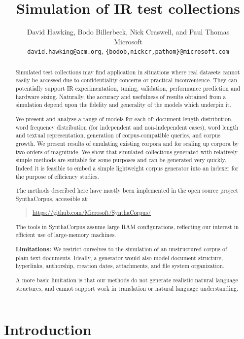\documentclass[11pt]{report}
\title{Simulation of IR test collections}
\author{David Hawking,
Bodo Billerbeck,
Nick Craswell, and 
Paul Thomas\\
Microsoft\\
\small \texttt{david.hawking@acm.org}, \texttt{\{bodob,nickcr,pathom\}@microsoft.com}
}
\newcommand{\GHRepo}{\url{https://github.com/Microsoft/SynthaCorpus/}}
\begin{document}
\maketitle{}

\tableofcontents

\begin{abstract}
Simulated test collections may find application in situations where real
datasets cannot easily be accessed due to confidentiality concerns or
practical inconvenience.  They can potentially support IR
experimentation, tuning, validation, performance prediction and
hardware sizing.  Naturally, the accuracy and usefulness of results
obtained from a simulation depend upon the fidelity and generality of
the models which underpin it.

We present and analyse a range of models for each of: document length
distribution, word frequency distribution (for independent and
non-independent cases), word length and textual representation,
generation of corpus-compatible queries, and corpus growth.  We
present results of emulating existing corpora and for scaling up
corpora by two orders of magnitude.  We show that simulated
collections generated with relatively simple methods are suitable for
some purposes and can be generated very quickly.  Indeed it is
feasible to embed a simple lightweight corpus generator into an
indexer for the purpose of efficiency studies.

The methods described here have mostly been implemented in the open source
project SynthaCorpus, accessible at:
\begin{quote}
  \GHRepo{}
\end{quote}

The tools in
SynthaCorpus assume large RAM configurations, reflecting our interest
in efficient use of large-memory machines.

\textbf{Limitations:} We restrict ourselves to the simulation of
an unstructured corpus of plain text documents.  Ideally, a generator
would also model document structure, hyperlinks, authorship, creation
dates, attachments, and file system organization.

A more basic
limitation is that our methods do not generate realistic natural language
structures, and cannot support work in translation or natural language
understanding.

\end{abstract}

\chapter{Introduction}   %
\end{document}
